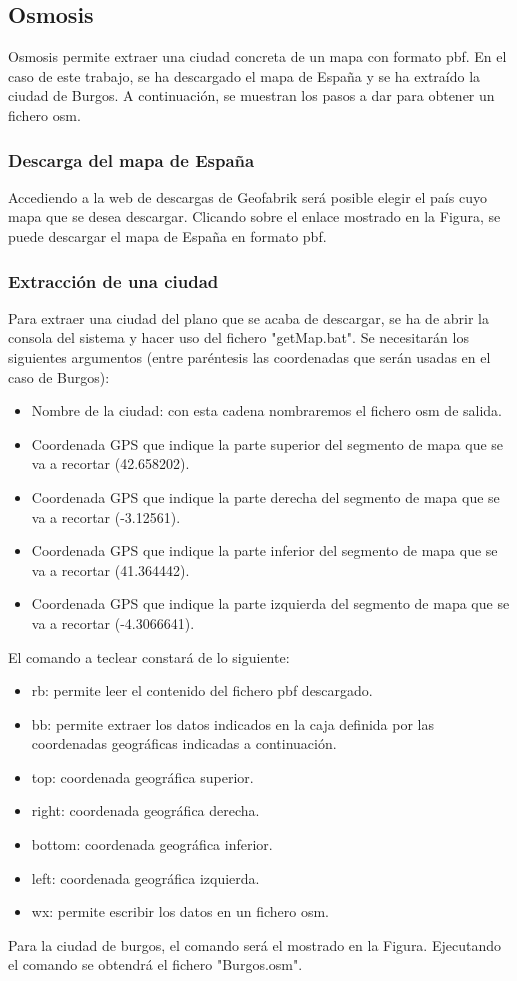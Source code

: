 \subsection{Osmosis}
Osmosis permite extraer una ciudad concreta de un mapa con formato pbf. En el caso de este trabajo, se ha descargado el mapa de España y se ha extraído la ciudad de Burgos. A continuación, se muestran los pasos a dar para obtener un fichero osm.

\subsubsection{Descarga del mapa de España}
Accediendo a la web de descargas de Geofabrik será posible elegir el país cuyo mapa que se desea descargar. Clicando sobre el enlace mostrado en la Figura, se puede descargar el mapa de España en formato pbf.

\subsubsection{Extracción de una ciudad}
Para extraer una ciudad del plano que se acaba de descargar, se ha de abrir la consola del sistema y hacer uso del fichero "getMap.bat". Se necesitarán los siguientes argumentos (entre paréntesis las coordenadas que serán usadas en el caso de Burgos):
\begin{itemize}
	\item Nombre de la ciudad: con esta cadena nombraremos el fichero osm de salida.
	\item Coordenada GPS que indique la parte superior del segmento de mapa que se va a recortar (42.658202).
	\item Coordenada GPS que indique la parte derecha del segmento de mapa que se va a recortar (-3.12561).
	\item Coordenada GPS que indique la parte inferior del segmento de mapa que se va a recortar (41.364442).
	\item Coordenada GPS que indique la parte izquierda del segmento de mapa que se va a recortar (-4.3066641).
\end{itemize}

El comando a teclear constará de lo siguiente:
\begin{itemize}
	\item rb: permite leer el contenido del fichero pbf descargado.
	\item bb: permite extraer los datos indicados en la caja definida por las coordenadas geográficas indicadas a continuación.
	\item top: coordenada geográfica superior.
	\item right: coordenada geográfica derecha.
	\item bottom: coordenada geográfica inferior.
	\item left: coordenada geográfica izquierda.
	\item wx: permite escribir los datos en un fichero osm.
\end{itemize}

Para la ciudad de burgos, el comando será el mostrado en la Figura. Ejecutando el comando se obtendrá el fichero "Burgos.osm".


